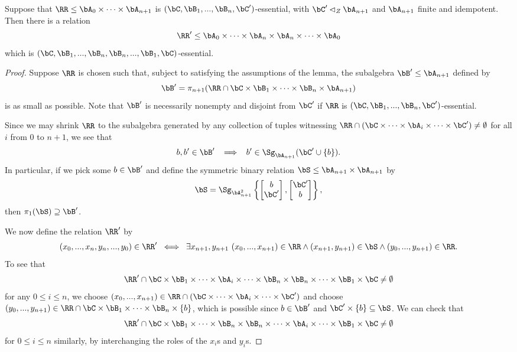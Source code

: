 \begin{lem} Suppose that $\RR \le \bA_0 \times \cdots \times \bA_{n+1}$ is $(\bC,\bB_1, ..., \bB_n, \bC')$-essential, with $\bC' \lhd_Z \bA_{n+1}$ and $\bA_{n+1}$ finite and idempotent. Then there is a relation
\[
\RR' \le \bA_0 \times \cdots \times \bA_n \times \bA_n \times \cdots \times \bA_0
\]
which is $(\bC,\bB_1, ..., \bB_n, \bB_n, ..., \bB_1, \bC)$-essential.
\end{lem}
\begin{proof} Suppose $\RR$ is chosen such that, subject to satisfying the assumptions of the lemma, the subalgebra $\bB' \le \bA_{n+1}$ defined by
\[
\bB' = \pi_{n+1}(\RR \cap \bC\times \bB_1 \times \cdots \times \bB_n \times \bA_{n+1})
\]
is as small as possible. Note that $\bB'$ is necessarily nonempty and disjoint from $\bC'$ if $\RR$ is $(\bC,\bB_1, ..., \bB_n, \bC')$-essential.

Since we may shrink $\RR$ to the subalgebra generated by any collection of tuples witnessing $\RR \cap (\bC\times\cdots \times \bA_i \times \cdots \times \bC') \ne \emptyset$ for all $i$ from $0$ to $n+1$, we see that
\[
b,b' \in \bB' \;\; \implies \;\; b' \in \Sg_{\bA_{n+1}}(\bC' \cup \{b\}).
\]
In particular, if we pick some $b \in \bB'$ and define the symmetric binary relation $\bS \le \bA_{n+1}\times \bA_{n+1}$ by
\[
\bS = \Sg_{\bA_{n+1}^2}\left\{\begin{bmatrix} b\\ \bC' \end{bmatrix}, \begin{bmatrix} \bC' \\ b \end{bmatrix}\right\},
\]
then $\pi_1(\bS) \supseteq \bB'$.

We now define the relation $\RR'$ by
\[
(x_0, ..., x_n, y_n, ..., y_0) \in \RR' \; \iff \; \exists x_{n+1},y_{n+1}\ (x_0, ..., x_{n+1}) \in \RR \wedge (x_{n+1},y_{n+1}) \in \bS \wedge (y_0, ..., y_{n+1}) \in \RR.
\]
To see that
\[
\RR' \cap \bC\times\bB_1\times \cdots \times \bA_i \times \cdots \times \bB_n \times \bB_n \times \cdots \times \bB_1 \times \bC \ne \emptyset
\]
for any $0 \le i \le n$, we choose $(x_0, ..., x_{n+1}) \in \RR \cap (\bC\times\cdots \times \bA_i \times \cdots \times \bC')$ and choose $(y_0, ..., y_{n+1}) \in \RR \cap \bC\times \bB_1 \times \cdots \times \bB_n \times \{b\}$, which is possible since $b \in \bB'$ and $\bC' \times \{b\} \subseteq \bS$. We can check that
\[
\RR' \cap \bC\times\bB_1\times \cdots \times \bB_n \times \bB_n \times \cdots \times \bA_i \times \cdots \times \bB_1 \times \bC \ne \emptyset
\]
for $0 \le i \le n$ similarly, by interchanging the roles of the $x_i$s and $y_i$s.


\end{proof}
